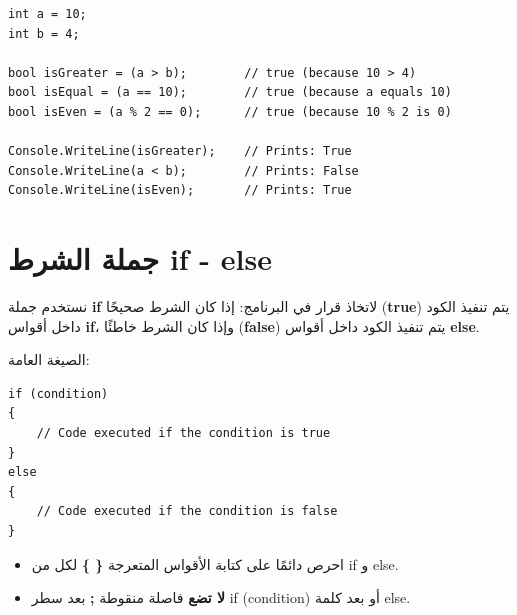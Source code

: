 \documentclass[14pt]{extarticle}
\begin{document}
\begin{boxExample}
\begin{english}
\begin{verbatim}
int a = 10;
int b = 4;

bool isGreater = (a > b);        // true (because 10 > 4)
bool isEqual = (a == 10);        // true (because a equals 10)
bool isEven = (a % 2 == 0);      // true (because 10 % 2 is 0)

Console.WriteLine(isGreater);    // Prints: True
Console.WriteLine(a < b);        // Prints: False
Console.WriteLine(isEven);       // Prints: True
\end{verbatim}
\end{english}
\end{boxExample}

\clearpage
\section{جملة الشرط \textenglish{if - else}}

نستخدم جملة \textbf{\textenglish{if}} لاتخاذ قرار في البرنامج: إذا كان الشرط صحيحًا (\textbf{\textenglish{true}}) يتم تنفيذ الكود داخل أقواس \textbf{\textenglish{if}}، وإذا كان الشرط خاطئًا (\textbf{\textenglish{false}}) يتم تنفيذ الكود داخل أقواس \textbf{\textenglish{else}}.

الصيغة العامة:
\begin{boxCode}
\begin{english}
\begin{verbatim}
if (condition)
{
    // Code executed if the condition is true
}
else
{
    // Code executed if the condition is false
}
\end{verbatim}
\end{english}
\end{boxCode}

\begin{boxNote}
\begin{itemize}
    \item احرص دائمًا على كتابة الأقواس المتعرجة \textbf{\textenglish{\{ \}}} لكل من \textenglish{if} و \textenglish{else}.
    \item \textbf{لا تضع} فاصلة منقوطة \textbf{\textenglish{;}} بعد سطر \textenglish{if (condition)} أو بعد كلمة \textenglish{else}.
\end{itemize}
\end{boxNote}
\end{document}
